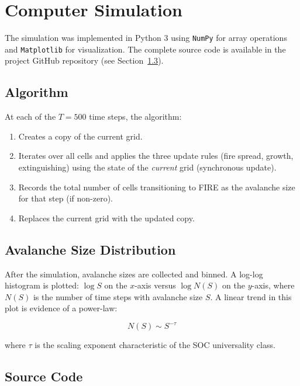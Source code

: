 \documentclass[12pt, a4paper]{article}
\begin{document}
\section{Computer Simulation}
\label{sec:simulation}

The simulation was implemented in Python 3 using \texttt{NumPy} for array operations
and \texttt{Matplotlib} for visualization. The complete source code is available in
the project GitHub repository (see Section~\ref{sec:code_link}).

\subsection{Algorithm}

At each of the $T = 500$ time steps, the algorithm:
\begin{enumerate}
    \item Creates a copy of the current grid.
    \item Iterates over all cells and applies the three update rules (fire spread,
    growth, extinguishing) using the state of the \emph{current} grid (synchronous
    update).
    \item Records the total number of cells transitioning to FIRE as the avalanche
    size for that step (if non-zero).
    \item Replaces the current grid with the updated copy.
\end{enumerate}

\subsection{Avalanche Size Distribution}

After the simulation, avalanche sizes are collected and binned. A log-log histogram
is plotted: $\log S$ on the $x$-axis versus $\log N(S)$ on the $y$-axis, where
$N(S)$ is the number of time steps with avalanche size $S$. A linear trend in this
plot is evidence of a power-law:

\begin{equation}
    N(S) \sim S^{-\tau}
\end{equation}

where $\tau$ is the scaling exponent characteristic of the SOC universality class.

\subsection{Source Code}
\label{sec:code_link}
\end{document}
